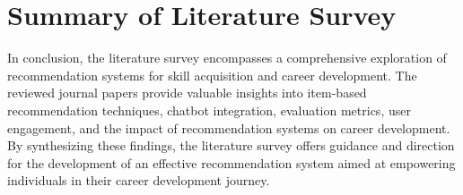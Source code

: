\section{Summary of Literature Survey}

In conclusion, the literature survey encompasses a comprehensive exploration of recommendation systems for skill acquisition and career development. The reviewed journal papers provide valuable insights into item-based recommendation techniques, chatbot integration, evaluation metrics, user engagement, and the impact of recommendation systems on career development. By synthesizing these findings, the literature survey offers guidance and direction for the development of an effective recommendation system aimed at empowering individuals in their career development journey.